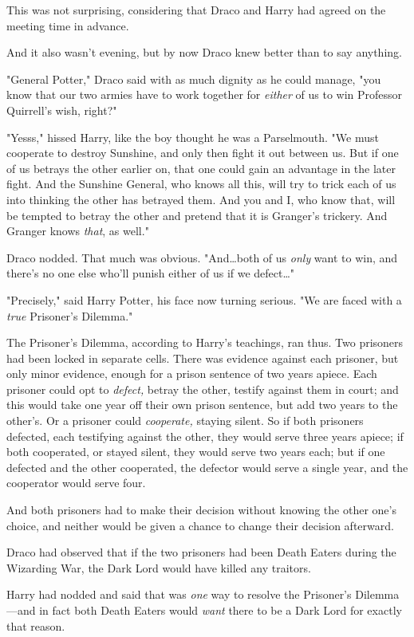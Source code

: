 This was not surprising, considering that Draco and Harry had agreed on the
meeting time in advance.

And it also wasn't evening, but by now Draco knew better than to say anything.

"General Potter," Draco said with as much dignity as he could manage, "you know
that our two armies have to work together for \emph{either} of us to win
Professor Quirrell's wish, right?"

"Yesss," hissed Harry, like the boy thought he was a Parselmouth. "We must
cooperate to destroy Sunshine, and only then fight it out between us. But if
one of us betrays the other earlier on, that one could gain an advantage in the
later fight. And the Sunshine General, who knows all this, will try to trick
each of us into thinking the other has betrayed them. And you and I, who know
that, will be tempted to betray the other and pretend that it is Granger's
trickery. And Granger knows \emph{that}, as well."

Draco nodded. That much was obvious. "And…both of us \emph{only} want
to win, and there's no one else who'll punish either of us if we defect…"

"Precisely," said Harry Potter, his face now turning serious. "We are faced
with a \emph{true} Prisoner's Dilemma."

The Prisoner's Dilemma, according to Harry's teachings, ran thus. Two prisoners
had been locked in separate cells. There was evidence against each prisoner,
but only minor evidence, enough for a prison sentence of two years apiece. Each
prisoner could opt to \emph{defect,} betray the other, testify against them in
court; and this would take one year off their own prison sentence, but add two
years to the other's. Or a prisoner could \emph{cooperate,} staying silent. So
if both prisoners defected, each testifying against the other, they would serve
three years apiece; if both cooperated, or stayed silent, they would serve two
years each; but if one defected and the other cooperated, the defector would
serve a single year, and the cooperator would serve four.

And both prisoners had to make their decision without knowing the other one's
choice, and neither would be given a chance to change their decision afterward.

Draco had observed that if the two prisoners had been Death Eaters during the
Wizarding War, the Dark Lord would have killed any traitors.

Harry had nodded and said that was \emph{one} way to resolve the Prisoner's
Dilemma---and in fact both Death Eaters would \emph{want} there to be a Dark
Lord for exactly that reason.

